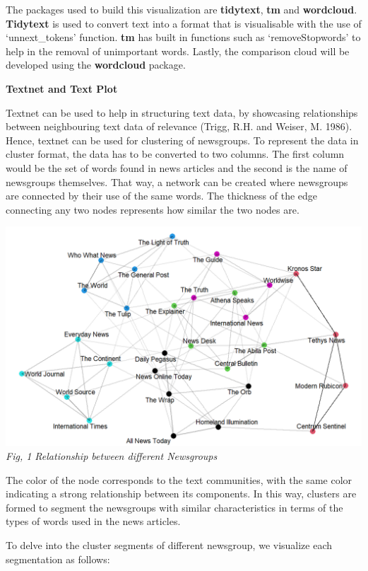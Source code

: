 \documentclass{acm_proc_article-sp}
\begin{document}
The packages used to build this visualization are \textbf{tidytext},
\textbf{tm} and \textbf{wordcloud}. \textbf{Tidytext} is used to convert
text into a format that is visualisable with the use of `unnext\_tokens'
function. \textbf{tm} has built in functions such as `removeStopwords'
to help in the removal of unimportant words. Lastly, the comparison
cloud will be developed using the \textbf{wordcloud} package.

\textbf{Textnet and Text Plot}

Textnet can be used to help in structuring text data, by showcasing
relationships between neighbouring text data of relevance (Trigg, R.H.
and Weiser, M. 1986). Hence, textnet can be used for clustering of
newsgroups. To represent the data in cluster format, the data has to be
converted to two columns. The first column would be the set of words
found in news articles and the second is the name of newsgroups
themselves. That way, a network can be created where newsgroups are
connected by their use of the same words. The thickness of the edge
connecting any two nodes represents how similar the two nodes are.

\includegraphics{img/image02.png} \emph{Fig, 1 Relationship between
different Newsgroups}

The color of the node corresponds to the text communities, with the same
color indicating a strong relationship between its components. In this
way, clusters are formed to segment the newsgroups with similar
characteristics in terms of the types of words used in the news
articles.

To delve into the cluster segments of different newsgroup, we visualize
each segmentation as follows:
\end{document}
